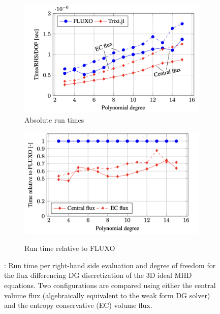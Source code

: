 \documentclass{article}
\begin{document}
\begin{figure}[H]
    \begin{subfigure}{0.5\textwidth} %
        \centering
        \includegraphics[width=1\linewidth]{abs.png}
        \caption{Absolute run times}
        \label{fig:figure1}
    \end{subfigure}%
    \begin{subfigure}{0.5\textwidth} %
        \centering
        \includegraphics[width=1\linewidth]{rel.png}
        \caption{Run time relative to FLUXO}
        \label{fig:figure2}
        \cite{ranocha2021adaptive}
    \end{subfigure}
    \caption{: Run time per right-hand side evaluation and degree of freedom for
the flux differencing DG discretization of the 3D ideal MHD equations.
Two configurations are compared using either the central volume flux (algebraically equivalent to the weak form DG solver) and the entropy conservative (EC) volume flux.}
    \label{fig:combined}
\end{figure}
\end{document}
